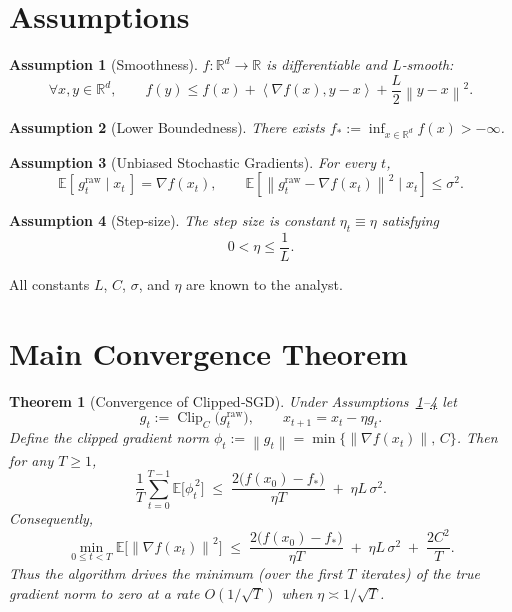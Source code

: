 \documentclass{article}
\newtheorem{theorem}{Theorem}
\newtheorem{assumption}{Assumption}
\newcommand{\E}{\mathbb{E}}
\newcommand{\R}{\mathbb{R}}
\newcommand{\norm}[1]{\left\lVert#1\right\rVert}
\newcommand{\inner}[2]{\left\langle #1,#2\right\rangle}
\begin{document}
\section*{Assumptions}
\begin{assumption}[Smoothness]\label{ass:smooth}
$f:\R^d\to\R$ is differentiable and $L$‑smooth:
\[
\forall x,y\in\R^d,\qquad
f(y)\le f(x)+\inner{\nabla f(x)}{y-x}+\frac{L}{2}\norm{y-x}^2 .
\]
\end{assumption}
\begin{assumption}[Lower Boundedness]\label{ass:lower}
There exists $f_*:=\inf_{x\in\R^d}f(x)>-\infty$.
\end{assumption}
\begin{assumption}[Unbiased Stochastic Gradients]\label{ass:unbiased}
For every $t$,
\[
\E\!\left[\,g^{\text{raw}}_t\mid x_t\,\right]=\nabla f(x_t),\qquad
\E\!\left[\norm{g^{\text{raw}}_t-\nabla f(x_t)}^2\mid x_t\right]\le\sigma^2 .
\]
\end{assumption}
\begin{assumption}[Step‑size]\label{ass:stepsize}
The step size is constant $\eta_t\equiv\eta$ satisfying
\[
0<\eta\le\frac{1}{L}.
\]
\end{assumption}
All constants $L$, $C$, $\sigma$, and $\eta$ are known to the analyst.

\section*{Main Convergence Theorem}
\begin{theorem}[Convergence of Clipped‑SGD]\label{thm:main}
Under Assumptions~\ref{ass:smooth}--\ref{ass:stepsize} let
\[
g_t:=\operatorname{Clip}_C\!\bigl(g^{\text{raw}}_t\bigr),\qquad
x_{t+1}=x_t-\eta g_t .
\]
Define the \emph{clipped gradient norm} $\phi_t:=\norm{g_t}=
\min\bigl\{\norm{\nabla f(x_t)},\,C\bigr\}$.
Then for any $T\ge1$,
\[
\frac{1}{T}\sum_{t=0}^{T-1}\E\!\bigl[\phi_t^{\,2}\bigr]
\;\le\;
\frac{2\bigl(f(x_0)-f_*\bigr)}{\eta T}
\;+\;
\eta L\,\sigma^{2}.
\tag{4}
\]
Consequently,
\[
\min_{0\le t<T}\E\!\bigl[\norm{\nabla f(x_t)}^{2}\bigr]
\;\le\;
\frac{2\bigl(f(x_0)-f_*\bigr)}{\eta T}
\;+\;
\eta L\,\sigma^{2}
\;+\;
\frac{2C^{2}}{T}.
\tag{5}
\]
Thus the algorithm drives the \emph{minimum} (over the first $T$ iterates) of the
true gradient norm to zero at a rate $O(1/\sqrt{T})$ when $\eta\asymp
1/\sqrt{T}$.
\end{theorem}
\end{document}
